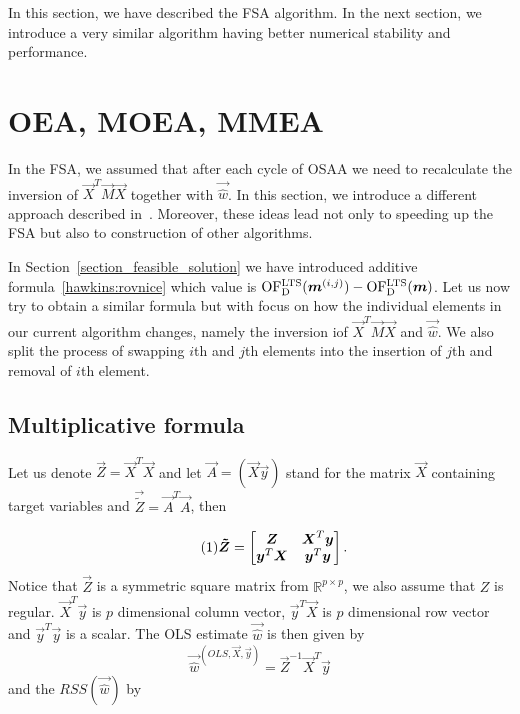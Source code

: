 In this section, we have described the FSA algorithm. In the next section, we introduce a very similar algorithm having better numerical stability and performance.








\section{OEA, MOEA, MMEA} \label{oeamoeammea}

In the FSA, we assumed that after each cycle of OSAA we need to recalculate the inversion of $\vec{X}^T\vec{M}\vec{X}$ together with $\vec{\hat{w}}$. In this section, we introduce a different approach described in~\cite{agullo2001new}.
Moreover, these ideas lead not only to speeding up the FSA but also to construction of other algorithms. 

In Section~\ref{section_feasible_solution} we have introduced additive formula~\eqref{hawkins:rovnice} which value is $\operatorname{OF^{LTS}_D}(\boldsymbol{m}^{(i,j)}) - \operatorname{OF^{LTS}_D}(\boldsymbol{m})$. Let us now try to obtain a similar formula but with focus on how the individual elements in our current algorithm changes, namely the inversion iof $\vec{X}^T\vec{M}\vec{X}$ and $\vec{\hat{w}}$. We also split the process of swapping $i$th and $j$th elements into the insertion of $j$th and removal of $i$th element.





\subsection{Multiplicative formula}



Let us denote $\vec{Z} = \vec{X}^T\vec{X}$ and let $\vec{A} = (\vec{X} \vec{y})$ stand for the matrix $\vec{X}$ containing target variables and $\vec{\tilde{Z}} = \vec{A}^T\vec{A}$, then

\[  \numberthis \label{matrixZ}
    \vec{\tilde{Z}} = \begin{bmatrix}
        \vec{Z} & \vec{X}^T\vec{y} \\
    \vec{y}^T\vec{X} & \vec{y}^T\vec{y}
  \end{bmatrix} .
\]
Notice that $\vec{Z}$ is a symmetric square matrix from $\mathbb{R}^ {p \times p}$, we also assume that $Z$ is regular. $\vec{X}^T\vec{y}$ is $p$ dimensional column vector, $\vec{y}^T\vec{X}$ is $p$ dimensional row vector and $\vec{y}^T\vec{y}$ is a scalar. The
OLS estimate $\vec{\hat{w}}$ is then given by
\begin{equation}
    \vec{\hat{w}}^{(OLS,\vec{X}, \vec{y})} = \vec{Z}^{-1} \vec{X}^T\vec{y}
\end{equation}
and the $RSS(\vec{\hat{w}})$ by 

